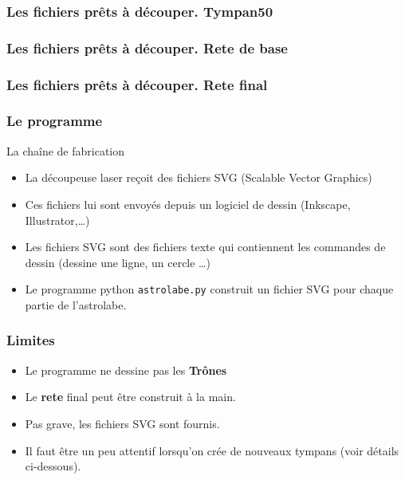 \documentclass{beamer}
\begin{document}
\begin{frame}\frametitle{Les fichiers prêts à découper.  Tympan50}
\begin{center}
\end{center}
   \end{frame}
   

\begin{frame}\frametitle{Les fichiers prêts à découper.  Rete de base}
\begin{center}
\end{center}
   \end{frame}
   
\begin{frame}\frametitle{Les fichiers prêts à découper.  Rete final}
\begin{center}
\end{center}
   \end{frame}
   
\begin{frame}\frametitle{Le programme}
\begin{block}{La chaîne de fabrication}
\begin{itemize}
\item La découpeuse laser reçoit des fichiers SVG (Scalable Vector Graphics)
\item Ces fichiers lui sont envoyés depuis un logiciel de dessin (Inkscape, Illustrator,\dots)
\item Les fichiers SVG sont des fichiers texte qui contiennent les commandes de dessin
(dessine une ligne, un cercle \dots)
\item Le programme python {\tt astrolabe.py} construit un fichier SVG pour chaque partie de l'astrolabe. 
\end{itemize}

\end{block}
   \end{frame}
   

\begin{frame}\frametitle{Limites}
\begin{itemize}
\item Le programme ne dessine pas les {\bf Trônes}
\item Le {\bf rete} final peut être construit à la main.
\item Pas grave, les fichiers SVG sont fournis. 
\item Il faut être un peu attentif lorsqu'on crée de nouveaux tympans (voir détails ci-dessous). 
\end{itemize}

   \end{frame}
   
\end{document}
